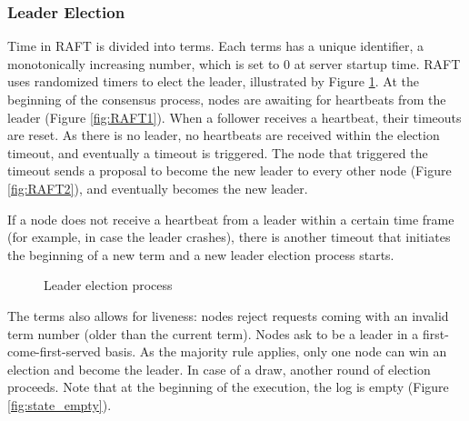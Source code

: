 \documentclass[12pt,a4paper]{article}
\begin{document}
\subsubsection{Leader Election}
Time in RAFT is divided into terms. Each terms has a unique identifier, a monotonically increasing number, which is set to 0 at server startup time. RAFT uses randomized timers to elect the leader, illustrated by Figure  \ref{fig:le_1}. At the beginning of the consensus process, nodes are awaiting for heartbeats from the leader (Figure \ref{fig:RAFT1}). When a follower receives a heartbeat, their timeouts are reset. As there is no leader, no heartbeats are received within the election timeout, and eventually a timeout is triggered. The node that triggered the timeout sends a proposal to become the new leader to every other node (Figure \ref{fig:RAFT2}), and eventually becomes the new leader.

If a node does not receive a heartbeat from a leader within a certain time frame (for example, in case the leader crashes), there is another timeout that initiates the beginning of a new term and a new leader election process starts.

\begin{figure}
    \centering
    \qquad
    \caption{Leader election process}%
    \label{fig:le_1}%
\end{figure}

The terms also allows for liveness: nodes reject requests coming with an invalid term number (older than the current term). Nodes ask to be a leader in a  first-come-first-served basis. As the majority rule applies, only one node can win an election and become the leader. In case of a draw, another round of election proceeds. Note that at the beginning of the execution, the log is empty (Figure \ref{fig:state_empty}).
\end{document}

